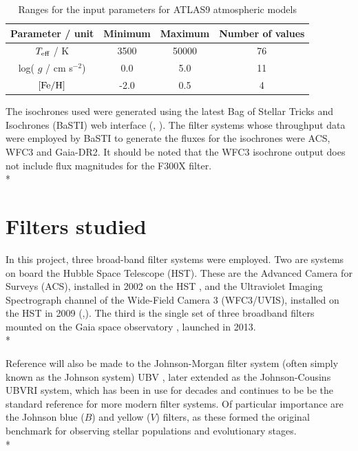 \documentclass[12pt, a4paper]{report}
\begin{document}
\begin{table}
\begin{center}
\begin{tabular}{cccc}
\hline
Parameter / unit & Minimum & Maximum & Number of values \\
\hline
$T_{\textnormal{eff}}$ / K & 3500 & 50000 & 76 \\
log( $g$ / cm s$^{-2}$) & 0.0 & 5.0 & 11 \\
$\textnormal{[Fe/H]}$ & -2.0 & 0.5 & 4 \\
\hline
\end{tabular}
\caption{Ranges for the input parameters for ATLAS9 atmospheric models}
\label{atlas9_input}
\end{center}
\end{table}

The isochrones used were generated using the latest Bag of Stellar Tricks and Isochrones (BaSTI) web interface (\cite{2004ApJ...612..168P}, \cite{2018ApJ...856..125H}). The filter systems whose throughput data were employed by BaSTI to generate the fluxes for the isochrones were ACS, WFC3 and Gaia-DR2. It should be noted that the WFC3 isochrone output does not include flux magnitudes for the F300X filter.\\*


\section{Filters studied}
In this project, three broad-band filter systems were employed. Two are systems on board the Hubble Space Telescope (HST). These are the Advanced Camera for Surveys (ACS), installed in 2002 on the HST \citep{2007AJ....133.1658S}, and the Ultraviolet Imaging Spectrograph channel of the Wide-Field Camera 3 (WFC3/UVIS), installed on the HST in 2009 (\cite{2010wfc..rept...14K},\cite{2010SPIE.7731E..0ZM}). The third is the single set of three broadband filters mounted on the Gaia space observatory  \citep{2010A&A...523A..48J}, launched in 2013. \\*

Reference will also be made to the Johnson-Morgan filter system (often simply known as the Johnson system) UBV \cite{1953ApJ...117..313J}, later extended as the Johnson-Cousins UBVRI \cite{1990PASP..102.1181B} system, which has been in use for decades and continues to be be the standard reference for more modern filter systems. Of particular importance are the Johnson blue ($B$) and yellow ($V$) filters, as these formed the original benchmark for observing stellar populations and evolutionary stages. \\*
\end{document}
